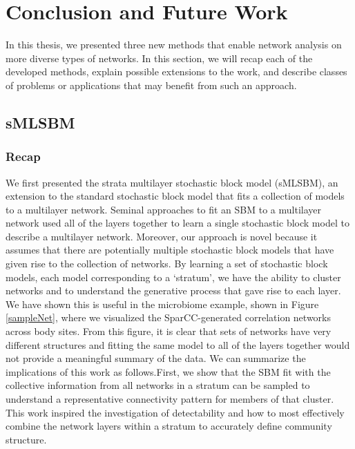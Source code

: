 \chapter{Conclusion and Future Work}
In this thesis, we presented three new methods that enable network analysis on more diverse types of networks. In this section, we will recap each of the developed methods, explain possible extensions to the work, and describe classes of problems or applications that may benefit from such an approach.

\section{sMLSBM}
\subsection{Recap}
We first presented the strata multilayer stochastic block model (sMLSBM), an extension to the standard stochastic block model that fits a collection of models to a multilayer network. Seminal approaches to fit an SBM to a multilayer network used all of the layers together to learn a single stochastic block model to describe a multilayer network. Moreover, our approach is novel because it assumes that there are potentially multiple stochastic block models that have given rise to the collection of networks. By learning a set of stochastic block models, each model corresponding to a `stratum', we have the ability to cluster networks and to understand the generative process that gave rise to each layer. We have shown this is useful in the microbiome example, shown in Figure \ref{sampleNet}, where we visualized the SparCC-generated correlation networks  across body sites. From this figure, it is clear that sets of networks have very different structures and fitting the same model to all of the layers together would not provide a meaningful summary of the data. We can summarize the implications of this work as follows.First, we show that the SBM fit with the collective information from all networks in a stratum can be sampled to understand a representative connectivity pattern for members of that cluster. This work inspired the investigation of detectability and how to most effectively combine the network layers within a stratum to accurately define community structure.


